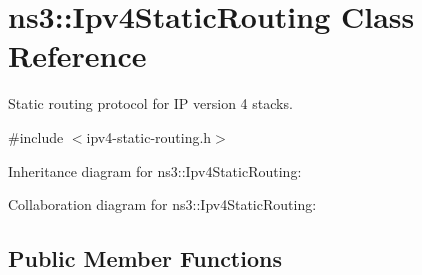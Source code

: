 \hypertarget{classns3_1_1Ipv4StaticRouting}{}\section{ns3\+:\+:Ipv4\+Static\+Routing Class Reference}
\label{classns3_1_1Ipv4StaticRouting}


Static routing protocol for IP version 4 stacks.  




{\ttfamily \#include $<$ipv4-\/static-\/routing.\+h$>$}



Inheritance diagram for ns3\+:\+:Ipv4\+Static\+Routing\+:


Collaboration diagram for ns3\+:\+:Ipv4\+Static\+Routing\+:
\subsection*{Public Member Functions}
